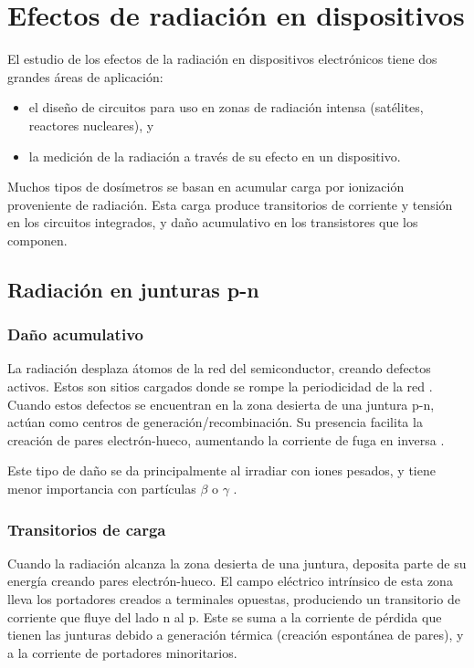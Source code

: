 \section{Efectos de radiación en dispositivos}
El estudio de los efectos de la radiación en dispositivos electrónicos 
tiene dos grandes áreas de aplicación:
\begin{itemize}
    \item el diseño de circuitos para uso en zonas de radiación intensa
        (satélites, reactores nucleares), y
    \item la medición de la radiación a través de su efecto en un dispositivo.
\end{itemize}
Muchos tipos de dosímetros se basan en acumular 
carga por ionización proveniente de radiación.
Esta carga produce transitorios de corriente y tensión en los circuitos 
integrados, y daño acumulativo en los transistores que los componen.

\subsection{Radiación en junturas p-n}
\subsubsection{Daño acumulativo}
La radiación desplaza átomos de la red del semiconductor, 
creando defectos activos.
Estos son sitios cargados donde se rompe la periodicidad de la red
\cite{iniewski_radiation_2011}.
Cuando estos defectos se encuentran en la zona desierta de una juntura p-n,
actúan como centros de generación/recombinación.
Su presencia facilita la creación de pares electrón-hueco, 
aumentando la corriente de fuga en inversa
.

Este tipo de daño se da principalmente al irradiar con iones pesados,
y tiene menor importancia con partículas $\beta$ o $\gamma$
\cite{knoll_radiation_2010}%
\cite{liu_electron_1971}.
\subsubsection{Transitorios de carga}
\label{latchup}
Cuando la radiación alcanza la zona desierta de una juntura,
deposita parte de su energía creando pares electrón-hueco.
El campo eléctrico intrínsico de esta zona
lleva los portadores creados a terminales opuestas,
produciendo un transitorio de corriente que fluye del lado n al p.
Este se suma a la corriente de pérdida que tienen las junturas
debido a generación térmica (creación espontánea de pares),
y a la corriente de portadores minoritarios.

